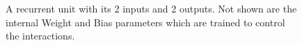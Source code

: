 \documentclass[12pt,parskip]{komatufte}
\begin{document}
\begin{figure}
	\caption{A recurrent unit with its 2 inputs and 2 outputs. Not shown are the internal Weight and Bias parameters which are trained to control the interactions.}	
	
	\label{fig-ru}
	
	
\end{figure}



 
\end{document}

